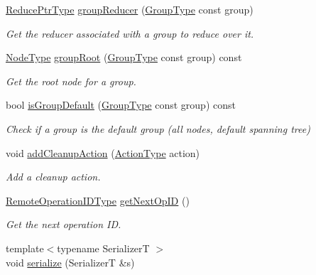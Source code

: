 \begin{DoxyCompactItemize}
\item 
\hyperlink{structvt_1_1group_1_1_group_manager_a0c646983506b624ad93ceb127df9e811}{Reduce\+Ptr\+Type} \hyperlink{structvt_1_1group_1_1_group_manager_a3234e5be55c32ccfb56785265e26b4c6}{group\+Reducer} (\hyperlink{namespacevt_a27b5e4411c9b6140c49100e050e2f743}{Group\+Type} const group)
\begin{DoxyCompactList}\small\item\em Get the reducer associated with a group to reduce over it. \end{DoxyCompactList}\item 
\hyperlink{namespacevt_a866da9d0efc19c0a1ce79e9e492f47e2}{Node\+Type} \hyperlink{structvt_1_1group_1_1_group_manager_ab5b8178a37165903c73f9159c9259cf5}{group\+Root} (\hyperlink{namespacevt_a27b5e4411c9b6140c49100e050e2f743}{Group\+Type} const group) const
\begin{DoxyCompactList}\small\item\em Get the root node for a group. \end{DoxyCompactList}\item 
bool \hyperlink{structvt_1_1group_1_1_group_manager_ad4d55f7bcf2aadd97c858b3f11c5d365}{is\+Group\+Default} (\hyperlink{namespacevt_a27b5e4411c9b6140c49100e050e2f743}{Group\+Type} const group) const
\begin{DoxyCompactList}\small\item\em Check if a group is the default group (all nodes, default spanning tree) \end{DoxyCompactList}\item 
void \hyperlink{structvt_1_1group_1_1_group_manager_a79edddb814a77d2ff45fea14291e95df}{add\+Cleanup\+Action} (\hyperlink{namespacevt_ae0a5a7b18cc99d7b732cb4d44f46b0f3}{Action\+Type} action)
\begin{DoxyCompactList}\small\item\em Add a cleanup action. \end{DoxyCompactList}\item 
\hyperlink{namespacevt_1_1group_a73f2624ddeb535b39a08b6524f26b244}{Remote\+Operation\+I\+D\+Type} \hyperlink{structvt_1_1group_1_1_group_manager_a472e95d136ef71c14ac5b4c931ff79b9}{get\+Next\+Op\+ID} ()
\begin{DoxyCompactList}\small\item\em Get the next operation ID. \end{DoxyCompactList}\item 
{\footnotesize template$<$typename SerializerT $>$ }\\void \hyperlink{structvt_1_1group_1_1_group_manager_a677d2bfaedd8f575f0c773feba40eb9c}{serialize} (SerializerT \&s)
\end{DoxyCompactItemize}
